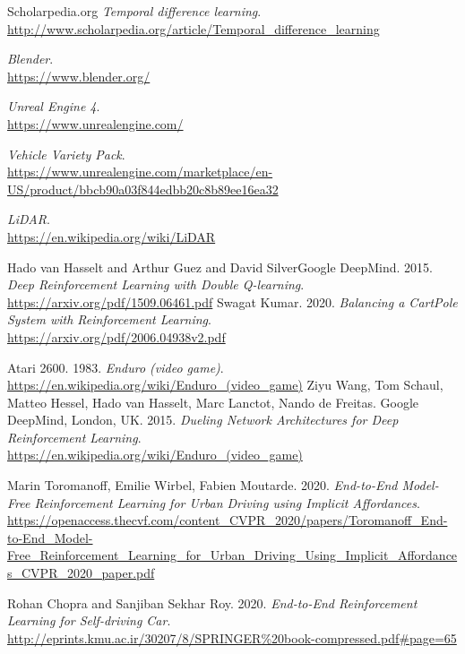 \documentclass[14pt]{extarticle}
\begin{document}
\begin{thebibliography}{999}
  Scholarpedia.org
  \emph{Temporal difference learning}.\\
  \url{http://www.scholarpedia.org/article/Temporal_difference_learning}
 
  \emph{Blender}.\\
  \url{https://www.blender.org/}
   
  \emph{Unreal Engine 4}.\\
  \url{https://www.unrealengine.com/}
   
   
  \emph{Vehicle Variety Pack}.\\
  \url{https://www.unrealengine.com/marketplace/en-US/product/bbcb90a03f844edbb20c8b89ee16ea32}
  
  \emph{LiDAR}.\\
  \url{https://en.wikipedia.org/wiki/LiDAR}
  
  Hado van Hasselt and Arthur Guez and David SilverGoogle DeepMind. 2015.
  \emph{Deep Reinforcement Learning with Double Q-learning}.\\
  \url{  https://arxiv.org/pdf/1509.06461.pdf}
  Swagat Kumar. 2020.
  \emph{Balancing a CartPole System with Reinforcement Learning}.\\
  \url{https://arxiv.org/pdf/2006.04938v2.pdf}
 
 
  	Atari 2600. 1983.
  \emph{Enduro (video game)}.\\
  \url{https://en.wikipedia.org/wiki/Enduro_(video_game)}
  	Ziyu Wang, Tom Schaul, Matteo Hessel, Hado van Hasselt, Marc Lanctot, Nando de Freitas. Google DeepMind, London, UK. 2015.
  \emph{Dueling Network Architectures for Deep Reinforcement Learning}.\\
  \url{https://en.wikipedia.org/wiki/Enduro_(video_game)}
   
   
  	Marin Toromanoff, Emilie Wirbel, Fabien Moutarde. 2020.
  \emph{End-to-End Model-Free Reinforcement Learning
for Urban Driving using Implicit Affordances}.\\
  \url{https://openaccess.thecvf.com/content_CVPR_2020/papers/Toromanoff_End-to-End_Model-Free_Reinforcement_Learning_for_Urban_Driving_Using_Implicit_Affordances_CVPR_2020_paper.pdf}

  	Rohan Chopra and Sanjiban Sekhar Roy. 2020.
  \emph{End-to-End Reinforcement Learning
for Self-driving Car}.\\
  \url{http://eprints.kmu.ac.ir/30207/8/SPRINGER\%20book-compressed.pdf\#page=65}
  

\end{thebibliography}
\end{document}
